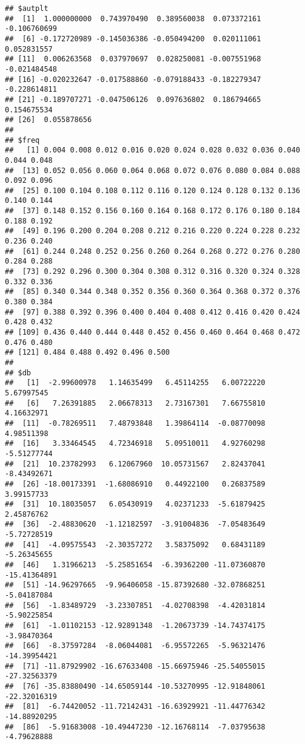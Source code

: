 \documentclass[
]{article}
\begin{document}
\begin{verbatim}
## $autplt
##  [1]  1.000000000  0.743970490  0.389560038  0.073372161 -0.106760699
##  [6] -0.172720989 -0.145036386 -0.050494200  0.020111061  0.052831557
## [11]  0.006263568  0.037970697  0.028250081 -0.007551968 -0.021484548
## [16] -0.020232647 -0.017588860 -0.079188433 -0.182279347 -0.228614811
## [21] -0.189707271 -0.047506126  0.097636802  0.186794665  0.154675534
## [26]  0.055878656
## 
## $freq
##   [1] 0.004 0.008 0.012 0.016 0.020 0.024 0.028 0.032 0.036 0.040 0.044 0.048
##  [13] 0.052 0.056 0.060 0.064 0.068 0.072 0.076 0.080 0.084 0.088 0.092 0.096
##  [25] 0.100 0.104 0.108 0.112 0.116 0.120 0.124 0.128 0.132 0.136 0.140 0.144
##  [37] 0.148 0.152 0.156 0.160 0.164 0.168 0.172 0.176 0.180 0.184 0.188 0.192
##  [49] 0.196 0.200 0.204 0.208 0.212 0.216 0.220 0.224 0.228 0.232 0.236 0.240
##  [61] 0.244 0.248 0.252 0.256 0.260 0.264 0.268 0.272 0.276 0.280 0.284 0.288
##  [73] 0.292 0.296 0.300 0.304 0.308 0.312 0.316 0.320 0.324 0.328 0.332 0.336
##  [85] 0.340 0.344 0.348 0.352 0.356 0.360 0.364 0.368 0.372 0.376 0.380 0.384
##  [97] 0.388 0.392 0.396 0.400 0.404 0.408 0.412 0.416 0.420 0.424 0.428 0.432
## [109] 0.436 0.440 0.444 0.448 0.452 0.456 0.460 0.464 0.468 0.472 0.476 0.480
## [121] 0.484 0.488 0.492 0.496 0.500
## 
## $db
##   [1]  -2.99600978   1.14635499   6.45114255   6.00722220   5.67997545
##   [6]   7.26391885   2.06678313   2.73167301   7.66755810   4.16632971
##  [11]  -0.78269511   7.48793848   1.39864114  -0.08770098   4.98511398
##  [16]   3.33464545   4.72346918   5.09510011   4.92760298  -5.51277744
##  [21]  10.23782993   6.12067960  10.05731567   2.82437041  -8.43492671
##  [26] -18.00173391  -1.68086910   0.44922100   0.26837589   3.99157733
##  [31]  10.18035057   6.05430919   4.02371233  -5.61879425   2.45876762
##  [36]  -2.48830620  -1.12182597  -3.91004836  -7.05483649  -5.72728519
##  [41]  -4.09575543  -2.30357272   3.58375092   0.68431189  -5.26345655
##  [46]   1.31966213  -5.25851654  -6.39362200 -11.07360870 -15.41364891
##  [51] -14.96297665  -9.96406058 -15.87392680 -32.07868251  -5.04187084
##  [56]  -1.83489729  -3.23307851  -4.02708398  -4.42031814  -5.90225854
##  [61]  -1.01102153 -12.92891348  -1.20673739 -14.74374175  -3.98470364
##  [66]  -8.37597284  -8.06044081  -6.95572265  -5.96321476 -14.39954421
##  [71] -11.87929902 -16.67633408 -15.66975946 -25.54055015 -27.32563379
##  [76] -35.83880490 -14.65059144 -10.53270995 -12.91848061 -22.32016319
##  [81]  -6.74420052 -11.72142431 -16.63929921 -11.44776342 -14.88920295
##  [86]  -5.91683008 -10.49447230 -12.16768114  -7.03795638  -4.79628888

\end{verbatim}
\end{document}
